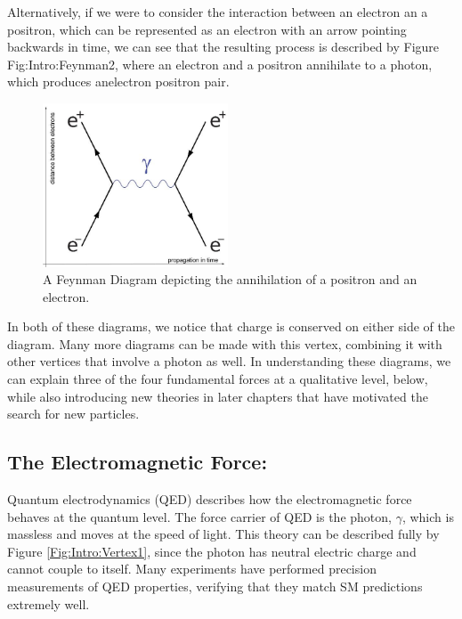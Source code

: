 Alternatively, if we were to consider the interaction between an electron an a positron, which can be represented as an electron with an arrow pointing backwards in time, we can see that the resulting process is described by Figure {Fig:Intro:Feynman2}, where an electron and a positron annihilate to a photon, which produces anelectron positron pair.
\begin{figure}[h]
    \centering
        \includegraphics[width=0.49\textwidth]{F1/FeynDiag2}
        \caption{A Feynman Diagram depicting the annihilation of a positron and an electron.}
        \label{Fig:Intro:Feynman2}
\end{figure}
In both of these diagrams, we notice that charge is conserved on either side of the diagram. Many more diagrams can be made with this vertex, combining it with other vertices that involve a photon as well. In understanding these diagrams, we can explain three of the four fundamental forces at a qualitative level, below, while also introducing new theories in later chapters that have motivated the search for new particles.

\subsection{The Electromagnetic Force:}
Quantum electrodynamics (QED) describes how the electromagnetic force behaves at the quantum level. The force carrier of QED is the photon, $\gamma$, which is massless and moves at the speed of light. This theory can be described fully by Figure \ref{Fig:Intro:Vertex1}, since the photon has neutral electric charge and cannot couple to itself. Many experiments have performed precision measurements of QED properties, verifying that they match SM predictions extremely well.

